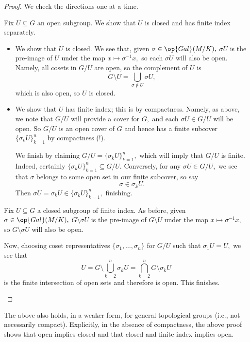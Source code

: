\begin{proof}
	We check the directions one at a time.
	\begin{listalph}
		\item Fix $U\subseteq G$ an open subgroup. We show that $U$ is closed and has finite index separately.
		\begin{itemize}
			\item We show that $U$ is closed. We see that, given $\sigma\in\op{Gal}(M/K),$ $\sigma U$ is the pre-image of $U$ under the map $x\mapsto\sigma^{-1}x,$ so each $\sigma U$ will also be open. Namely, all cosets in $G/U$ are open, so the complement of $U$ is
			\[G\setminus U=\bigcup_{\sigma\notin U}\sigma U,\]
			which is also open, so $U$ is closed.
			\item We show that $U$ has finite index; this is by compactness. Namely, as above, we note that $G/U$ will provide a cover for $G,$ and each $\sigma U\in G/U$ will be open. So $G/U$ is an open cover of $G$ and hence has a finite subcover $\{\sigma_kU\}_{k=1}^n$ by compactness (!).

			We finish by claiming $G/U=\{\sigma_kU\}_{k=1}^n,$ which will imply that $G/U$ is finite. Indeed, certainly $\{\sigma_kU\}_{k=1}^n\subseteq G/U.$ Conversely, for any $\sigma U\in G/U,$ we see that $\sigma$ belongs to some open set in our finite subcover, so say
			\[\sigma\in\sigma_kU.\]
			Then $\sigma U=\sigma_kU\in\{\sigma_kU\}_{k=1}^n,$ finishing.
		\end{itemize}

		\item Fix $U\subseteq G$ a closed subgroup of finite index. As before, given $\sigma\in\op{Gal}(M/K),$ $G\setminus\sigma U$ is the pre-image of $G\setminus U$ under the map $x\mapsto\sigma^{-1}x,$ so $G\setminus\sigma U$ will also be open.

		Now, choosing coset representatives $\{\sigma_1,\ldots,\sigma_n\}$ for $G/U$ such that $\sigma_1U=U,$ we see that
		\[U=G\setminus\bigcup_{k=2}^n\sigma_kU=\bigcap_{k=2}^nG\setminus\sigma_kU\]
		is the finite intersection of open sets and therefore is open. This finishes.
		\qedhere
	\end{listalph}
\end{proof}
\begin{remark}
	The above also holds, in a weaker form, for general topological groups (i.e., not necessarily compact). Explicitly, in the absence of compactness, the above proof shows that open implies closed and that closed and finite index implies open.
\end{remark}

